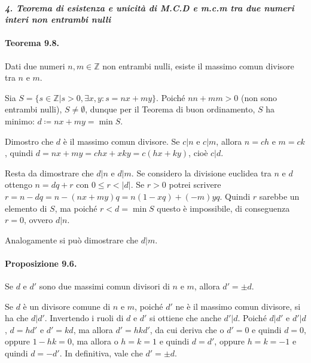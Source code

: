 \documentclass[12pt, a4paper]{report}
\theoremstyle{definition}
\newcommand{\Z}{\mathbb{Z}}
\begin{document}
\newpage
\paragraph{\emph{4. Teorema di esistenza e unicità di M.C.D e m.c.m tra due numeri
interi non entrambi nulli}}
\paragraph{Teorema 9.8.} Dati due numeri $n,m\in\Z$ non entrambi nulli, esiste
il massimo comun divisore tra $n$ e $m$.
\begin{demonstration}
    Sia $S=\{s\in\Z|s>0,\exists x,y:s=nx+my\}$. Poiché $nn+mm>0$ (non sono
    entrambi nulli), $S\neq\emptyset$, dunque per il Teorema di buon ordinamento,
    $S$ ha minimo: $d\coloneqq nx+my=\min{S}$.

    Dimostro che $d$ è il massimo comun divisore. Se $c|n$ e $c|m$, allora $n=ch$
    e $m=ck$, quindi $d=nx+my=chx+xky=c(hx+ky)$, cioè $c|d$.

    Resta da dimostrare che $d|n$ e $d|m$. Se considero la divisione euclidea tra
    $n$ e $d$ ottengo $n=dq+r$ con $0\leq r<|d|$. Se $r>0$ potrei scrivere $r=n-dq
    =n-(nx+my)q=n(1-xq)+(-m)yq$. Quindi $r$ sarebbe un elemento di $S$, ma poiché
    $r<d=\min{S}$ questo è impossibile, di conseguenza $r=0$, ovvero $d|n$.

    Analogamente si può dimostrare che $d|m$.
\end{demonstration}

\paragraph{Proposizione 9.6.} Se $d$ e $d'$ sono due massimi comun divisori di
$n$ e $m$, allora $d'=\pm d$.

\begin{demonstration}
    Se $d$ è un divisore comune di $n$ e $m$, poiché $d'$ ne è il massimo comun
    divisore, si ha che $d|d'$. Invertendo i ruoli di $d$ e $d'$ si ottiene che
    anche $d'|d$. Poiché $d|d'$ e $d'|d$, $d=hd'$ e $d'=kd$, ma allora $d'=hkd'$,
    da cui deriva che o $d'=0$ e quindi $d=0$, oppure $1-hk=0$, ma allora o $h=k=1$
    e quindi $d=d'$, oppure $h=k=-1$ e quindi $d=-d'$. In definitiva, vale che
    $d'=\pm d$.
\end{demonstration}
\end{document}
